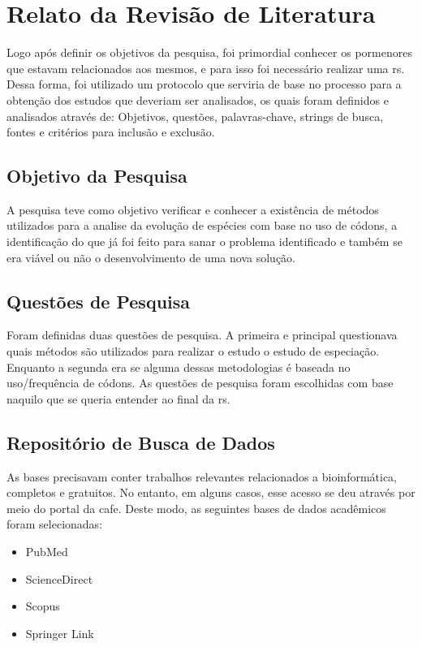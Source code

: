\documentclass[12pt]{article}
\begin{document}
\section{Relato da Revisão de Literatura}

Logo após definir os objetivos da pesquisa, foi primordial conhecer os pormenores que estavam relacionados aos mesmos, e para isso foi necessário realizar uma \gls{rs}. Dessa forma, foi utilizado um protocolo que serviria de base no processo para a obtenção dos estudos que deveriam ser analisados, os quais foram definidos e analisados através de: Objetivos, questões, palavras-chave, strings de busca, fontes e critérios para inclusão e exclusão.

\subsection{Objetivo da Pesquisa}

A pesquisa teve como objetivo verificar e conhecer a existência de métodos utilizados para a analise da evolução de espécies com base no uso de códons, a identificação do que já foi feito para sanar o problema identificado e também se era viável ou não o desenvolvimento de uma nova solução.

\subsection{Questões de Pesquisa}

Foram definidas duas questões de pesquisa. A primeira e principal questionava quais métodos são utilizados para realizar o estudo o estudo de especiação. Enquanto a segunda era se alguma dessas metodologias é baseada no uso/frequência de códons. As questões de pesquisa foram escolhidas com base naquilo que se queria entender ao final da \gls{rs}.

\subsection{Repositório de Busca de Dados}

As bases precisavam conter trabalhos relevantes relacionados a bioinformática, completos e gratuitos. No entanto, em alguns casos, esse acesso se deu através por meio do portal da \gls{cafe}. Deste modo, as seguintes bases de dados acadêmicos foram selecionadas:
\begin{itemize}
    \item{PubMed}
    \item{ScienceDirect}
    \item{Scopus}
    \item{Springer Link}
\end{itemize}
\end{document}
